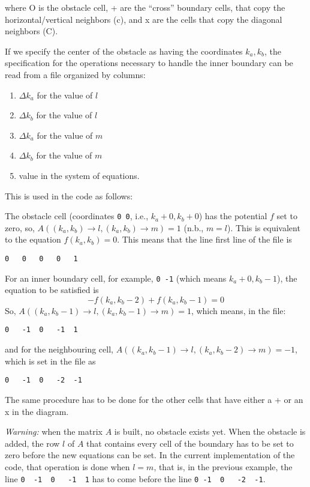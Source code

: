 \documentclass{article}
\begin{document}
where O is the obstacle cell, + are the ``cross'' boundary cells, that copy the
horizontal/vertical neighbors (c), and x are the cells that copy the diagonal
neighbors (C).

If we specify the center of the obstacle as having the coordinates $k_a,k_b$,
the specification for the operations necessary to handle the inner boundary can
be read from a file organized by columns:

\begin{enumerate}
	\item $\Delta k_a$ for the value of $l$
	\item $\Delta k_b$ for the value of $l$
	\item $\Delta k_a$ for the value of $m$
	\item $\Delta k_b$ for the value of $m$
	\item value in the system of equations.
\end{enumerate}

This is used in the code as follows:

The obstacle cell (coordinates \verb|0 0|, i.e., $k_a+0,k_b+0$) has the
potential $f$ set to zero, so, $A((k_a,k_b)\to l, (k_a,k_b)\to m) = 1$ (n.b.,
$m=l$). This is equivalent to the equation $f(k_a,k_b) = 0$. This means that the
line first line of the file is
\begin{verbatim}
0	0	0	0	1
\end{verbatim}

For an inner boundary cell, for example, \verb|0 -1| (which means
$k_a+0,k_b-1$), the equation to be satisfied is
\[ -f(k_a,k_b-2) + f(k_a,k_b-1) = 0 \]
So, $A((k_a,k_b-1)\to l, (k_a,k_b-1)\to m) = 1$, which means, in the file:
\begin{verbatim}
0	-1	0	-1	1
\end{verbatim}
and for the neighbouring cell,
$A((k_a,k_b-1)\to l, (k_a,k_b-2)\to m) = -1$, which is set in the file as
\begin{verbatim}
0	-1	0	-2	-1
\end{verbatim}

The same procedure has to be done for the other cells that have either a + or an
x in the diagram.

\emph{Warning:} when the matrix $A$ is built, no obstacle exists yet. When the
obstacle is added, the row $l$ of $A$ that contains every cell of the boundary
has to be set to zero before the new equations can be set. In the current
implementation of the code, that operation is done when $l = m$, that is, in the
previous example, the line \verb|0	-1	0	-1	1| has to come before the line
\verb|0	-1	0	-2	-1|.
\end{document}
